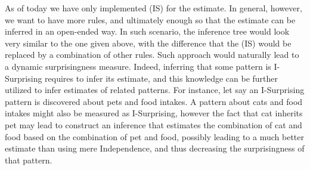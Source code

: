 \documentclass[runningheads]{llncs}
\begin{document}
As of today we have only implemented (IS) for the estimate. In
general, however, we want to have more rules, and ultimately enough so
that the estimate can be inferred in an open-ended way. In such
scenario, the inference tree would look very similar to the one given
above, with the difference that the (IS) would be replaced by a
combination of other rules. Such approach would naturally lead to a
dynamic surprisingness measure. Indeed, inferring that some pattern is
I-Surprising requires to infer its estimate, and this knowledge can be
further utilized to infer estimates of related patterns. For instance,
let say an I-Surprising pattern is discovered about pets and food
intakes. A pattern about cats and food intakes might also be measured
as I-Surprising, however the fact that cat inherits pet may lead to
construct an inference that estimates the combination of cat and food
based on the combination of pet and food, possibly leading to a much
better estimate than using mere Independence, and thus decreasing the
surprisingness of that pattern.








\end{document}
